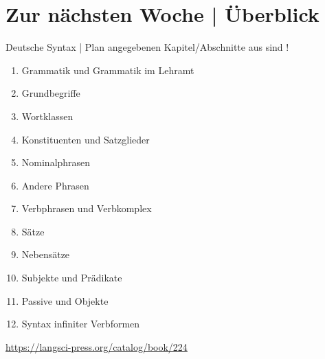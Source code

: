 \section{Zur nächsten Woche | Überblick}

\begin{frame}
  {Deutsche Syntax | Plan}
   angegebenen Kapitel\slash Abschnitte aus  sind !\\
  \Halbzeile
  \begin{enumerate}
    \item Grammatik und Grammatik im Lehramt 
    \item Grundbegriffe 
    \item Wortklassen 
    \item Konstituenten und Satzglieder 
    \item \alert{Nominalphrasen} 
    \item Andere Phrasen 
    \item Verbphrasen und Verbkomplex 
    \item Sätze  
    \item Nebensätze 
    \item Subjekte und Prädikate 
    \item Passive und Objekte 
    \item Syntax infiniter Verbformen 
  \end{enumerate}
  \Halbzeile
  \centering 
  \url{https://langsci-press.org/catalog/book/224}
\end{frame}



